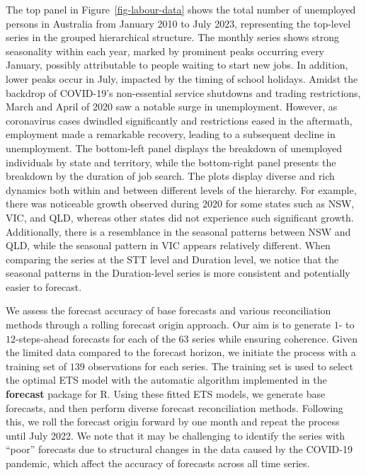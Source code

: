 \documentclass[
  12pt,
  11pt]{article}
\begin{document}
The top panel in Figure~\ref{fig-labour-data} shows the total number of
unemployed persons in Australia from January 2010 to July 2023,
representing the top-level series in the grouped hierarchical structure.
The monthly series shows strong seasonality within each year, marked by
prominent peaks occurring every January, possibly attributable to people
waiting to start new jobs. In addition, lower peaks occur in July,
impacted by the timing of school holidays. Amidst the backdrop of
COVID-19's non-essential service shutdowns and trading restrictions,
March and April of 2020 saw a notable surge in unemployment. However, as
coronavirus cases dwindled significantly and restrictions eased in the
aftermath, employment made a remarkable recovery, leading to a
subsequent decline in unemployment. The bottom-left panel displays the
breakdown of unemployed individuals by state and territory, while the
bottom-right panel presents the breakdown by the duration of job search.
The plots display diverse and rich dynamics both within and between
different levels of the hierarchy. For example, there was noticeable
growth observed during 2020 for some states such as NSW, VIC, and QLD,
whereas other states did not experience such significant growth.
Additionally, there is a resemblance in the seasonal patterns between
NSW and QLD, while the seasonal pattern in VIC appears relatively
different. When comparing the series at the STT level and Duration
level, we notice that the seasonal patterns in the Duration-level series
is more consistent and potentially easier to forecast.

We assess the forecast accuracy of base forecasts and various
reconciliation methods through a rolling forecast origin approach. Our
aim is to generate \(1\)- to \(12\)-steps-ahead forecasts for each of
the \(63\) series while ensuring coherence. Given the limited data
compared to the forecast horizon, we initiate the process with a
training set of \(139\) observations for each series. The training set
is used to select the optimal ETS model with the automatic algorithm
implemented in the \textbf{forecast} package for R. Using these fitted
ETS models, we generate base forecasts, and then perform diverse
forecast reconciliation methods. Following this, we roll the forecast
origin forward by one month and repeat the process until July 2022. We
note that it may be challenging to identify the series with ``poor''
forecasts due to structural changes in the data caused by the COVID-19
pandemic, which affect the accuracy of forecasts across all time series.
\end{document}
